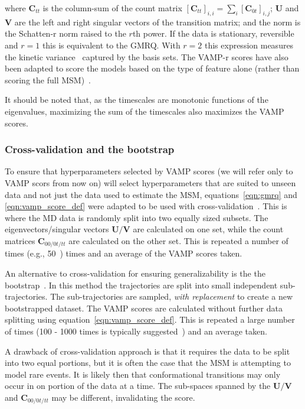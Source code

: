 \documentclass[journal=jacsat,manuscript=article]{achemso}
\begin{document}
where $\mathbf{C}_{tt}$ is the column-sum of the count matrix $[\mathbf{C}_{tt}]_{i, i} = \sum_i [\mathbf{C}_{0t}]_{i, j}$; $\mathbf{U}$ and $\mathbf{V}$ are the left and right singular vectors of the transition matrix; and the norm is the Schatten-r norm raised to the $r$th power.  If the data is stationary, reversible and $r=1$ this is equivalent to the GMRQ. With $r=2$ this expression measures the kinetic variance~\cite{noeKineticDistanceKinetic2015} captured by the basis sets. The VAMP-r scores have also been adapted to score the models based on the type of feature alone (rather than scoring the full MSM)~\cite{scherer_variational_2019}. 

It should be noted that, as the timescales are monotonic functions of the eigenvalues, maximizing the sum of the timescales also maximizes the VAMP scores. 

\subsubsection{Cross-validation and the bootstrap}
To ensure that hyperparameters selected by VAMP scores  (we will refer only to VAMP scors from now on) will select hyperparameters that are suited to unseen data and not just the data used to estimate the MSM, equations~\ref{eqn:gmrq} and \ref{eqn:vamp_score_def} were adapted to be used with cross-validation~\cite{arlotSurveyCrossvalidationProcedures2009}. This is where the MD data is randomly split into two equally sized subsets. The eigenvectors/singular vectors $\mathbf{U}/\mathbf{V}$ are calculated on one set, while the count matrices $\mathbf{C}_{00/0t/tt}$ are calculated on the other set.  This is repeated a number of times (e.g., 50~\cite{scherer_variational_2019}) times and an average of the VAMP scores taken.

An alternative to cross-validation for ensuring generalizability is the the bootstrap~\cite{efronIntroductionBootstrap1993}.  In this method the trajectories are split into small independent sub-trajectories. The sub-trajectories are sampled, \emph{with replacement} to create a new bootstrapped dataset. The VAMP scores are calculated without further data splitting using equation~\ref{eqn:vamp_score_def}.  This is repeated a large number of times (100 - 1000 times is typically suggested~\cite{efronIntroductionBootstrap1993}) and an average taken.

A drawback of cross-validation approach is that it requires the data to be split into two equal portions, but it is often the case that the MSM is attempting to model rare events.  It is likely then that conformational transitions may only occur in on portion of the data at a time. The sub-spaces spanned by the $\mathbf{U}/\mathbf{V}$ and $\mathbf{C}_{00/0t/tt}$ may be different, invalidating the score. 
\end{document}
